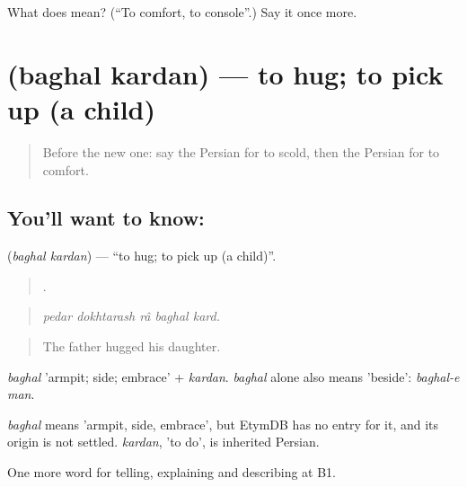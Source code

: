 \begin{tcolorbox}[breakable,colback=teal!4,colframe=teal!35!black,title={Before you move on}]
What does   mean? (\textquotedblleft{}To comfort, to console\textquotedblright{}.) Say it once more.
\end{tcolorbox}
\section[\texorpdfstring{\fa{بغل} \fa{کردن} (baghal kardan)}{بغل کردن (baghal kardan)}]{  (baghal kardan) — to hug; to pick up (a child)}

\label{lesson:FA-C505-baghal-kardan}



\begin{quote}
Before the new one: say the Persian for to scold, then the Persian for to comfort.
\end{quote}

\subsection*{You'll want to know:  }
\textbf{ } (\emph{baghal kardan}) — \textquotedblleft{}to hug; to pick up (a child)\textquotedblright{}.

\begin{quote}
    .
\end{quote}

\begin{quote}
\emph{pedar dokhtarash râ baghal kard.}
\end{quote}

\begin{quote}
The father hugged his daughter.
\end{quote}

\emph{baghal} 'armpit; side; embrace' + \emph{kardan}. \emph{baghal} alone also means 'beside': \emph{baghal-e man}.

\begin{cousinweb}
\emph{baghal} means 'armpit, side, embrace', but EtymDB has no entry for it, and its origin is not settled. \emph{kardan}, 'to do', is inherited Persian.
\end{cousinweb}

\begin{grammarlens}[title={What you've built}]
One more word for telling, explaining and describing at B1.
\end{grammarlens}

